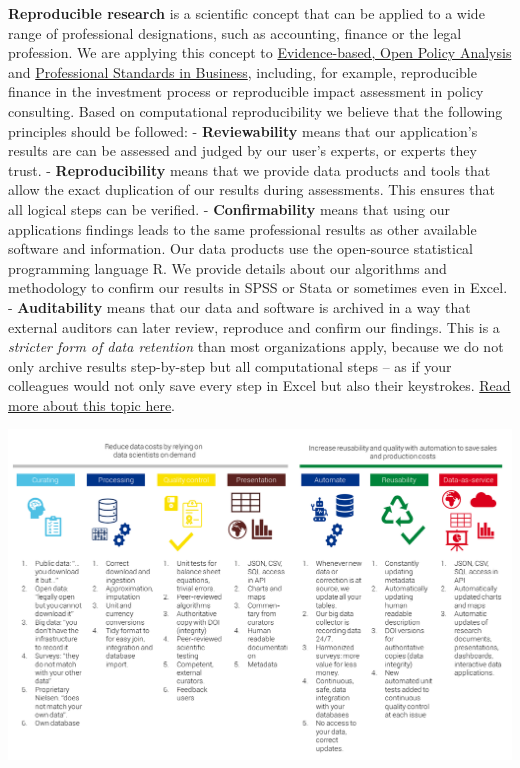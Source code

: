 \documentclass[
  a4paper,
  openany, a4paper, oneside]{book}
\begin{document}
\textbf{Reproducible research} is a scientific concept that can be applied to a wide range of professional designations, such as accounting, finance or the legal profession. We are applying this concept to \protect\hyperlink{opa}{Evidence-based, Open Policy Analysis} and \protect\hyperlink{business-professional-standards}{Professional Standards in Business}, including, for example, reproducible finance in the investment process or reproducible impact assessment in policy consulting. Based on computational reproducibility we believe that the following principles should be followed:
- \textbf{Reviewability} means that our application's results are can be assessed and judged by our user's experts, or experts they trust.
- \textbf{Reproducibility} means that we provide data products and tools that allow the exact duplication of our results during assessments. This ensures that all logical steps can be verified.
- \textbf{Confirmability} means that using our applications findings leads to the same professional results as other available software and information. Our data products use the open-source statistical programming language R. We provide details about our algorithms and methodology to confirm our results in SPSS or Stata or sometimes even in Excel.
- \textbf{Auditability} means that our data and software is archived in a way that external auditors can later review, reproduce and confirm our findings. This is a \emph{stricter form of data retention} than most organizations apply, because we do not only archive results step-by-step but all computational steps -- as if your colleagues would not only save every step in Excel but also their keystrokes. \protect\hyperlink{reproducible-research-theory}{Read more about this topic here}.

\begin{center}\includegraphics[width=18.67in]{plots/business_development/value_chain} \end{center}
\end{document}
